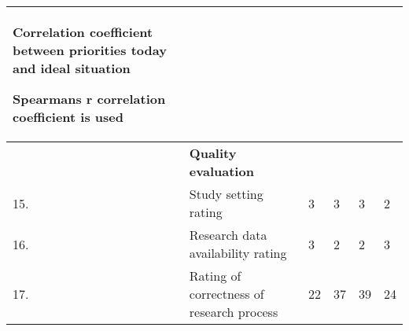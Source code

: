 \begin{table}
{\begin{tabular}{|>{\raggedright}p{}|>{\raggedright}p{}|>{\raggedright}p{}|>{\raggedright}p{}|>{\raggedright}p{}|>{\raggedright}p{}|}
Correlation coefficient between priorities today and ideal situation

Spearmans r correlation coefficient is used 
& \tabularnewline
\hline 
 & \textbf{Quality evaluation} &  &  &  & \tabularnewline
\hline 
15. & Study setting rating & 3 & 3 & 3 & 2\tabularnewline
\hline 
16. & Research data availability rating & 3 & 2 & 2 & 3\tabularnewline
\hline 
17. & Rating of correctness of research process & 22 & 37 & 39 & 24\tabularnewline
\hline
\end{tabular}%
}
\end{table}

